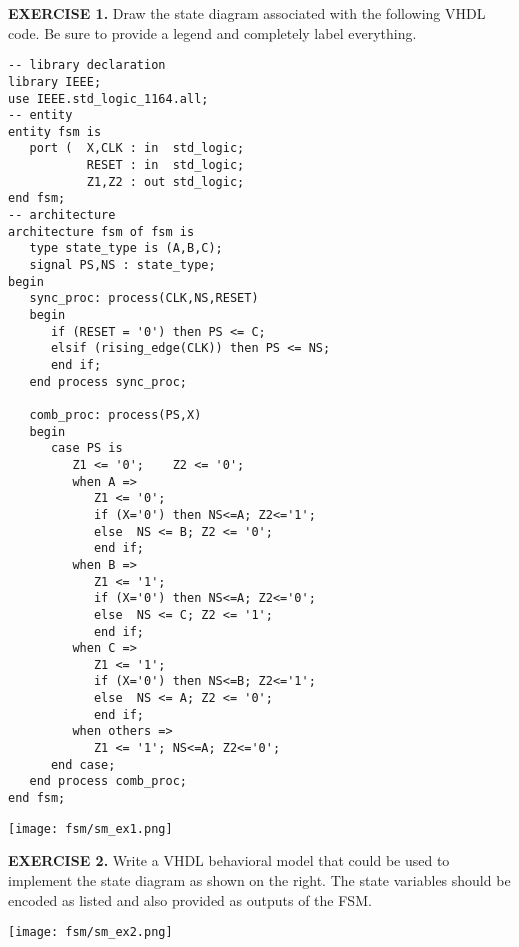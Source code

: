 \vspace{20pt}
\noindent
\begin{minipage}{1\textwidth}
\textbf{EXERCISE 1.}
Draw the state diagram associated with the following VHDL code. Be sure to provide a legend and completely label everything.
\end{minipage}
\begin{minipage}{0.66\textwidth}
\vspace{10px}
\begin{lstlisting}
-- library declaration
library IEEE;
use IEEE.std_logic_1164.all;
-- entity
entity fsm is 
   port (  X,CLK : in  std_logic; 
           RESET : in  std_logic; 
           Z1,Z2 : out std_logic;  
end fsm;
-- architecture
architecture fsm of fsm is
   type state_type is (A,B,C);
   signal PS,NS : state_type;
begin
   sync_proc: process(CLK,NS,RESET)
   begin
      if (RESET = '0') then PS <= C; 
      elsif (rising_edge(CLK)) then PS <= NS; 
      end if; 
   end process sync_proc; 

   comb_proc: process(PS,X)
   begin
      case PS is 
         Z1 <= '0';    Z2 <= '0'; 
         when A =>    
            Z1 <= '0';  
            if (X='0') then NS<=A; Z2<='1';   
            else  NS <= B; Z2 <= '0';
            end if; 
         when B =>    
            Z1 <= '1';  
            if (X='0') then NS<=A; Z2<='0';  
            else  NS <= C; Z2 <= '1'; 
            end if; 
         when C =>    
            Z1 <= '1';  
            if (X='0') then NS<=B; Z2<='1'; 
            else  NS <= A; Z2 <= '0'; 
            end if; 
         when others =>    
            Z1 <= '1'; NS<=A; Z2<='0'; 
      end case; 
   end process comb_proc; 
end fsm;
\end{lstlisting}
\end{minipage}
\begin{minipage}{0.29\textwidth}
\texttt{[image: fsm/sm\_ex1.png]}
\vspace{250px}
\end{minipage}

\vspace{20pt}
\noindent
\begin{minipage}[t]{0.5\textwidth}
\textbf{EXERCISE 2.}
Write a VHDL behavioral model that could be used to implement the state diagram as shown on the right. The state variables should be encoded as listed and also provided as outputs of the FSM.
\end{minipage}
\begin{minipage}[t]{0.47\textwidth}
\vspace{0pt}\raggedright
\centering
\texttt{[image: fsm/sm\_ex2.png]}
\end{minipage}

